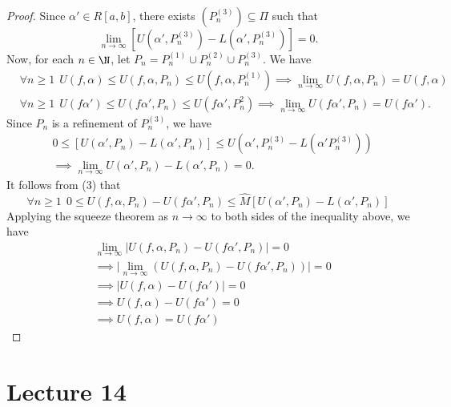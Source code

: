 \begin{proof}
Since \( \alpha' \in R[a,b] \), there exists \( ({P}_{n}^{(3)}) \subseteq \Pi  \) such that 
\[  \lim_{ n \to \infty } [U(\alpha', {P}_{n}^{(3)}) - L(\alpha', {P}_{n}^{(3)})]  = 0.   \]
Now, for each \( n \in \N \), let \( {P}_{n} = {P}_{n}^{(1)} \cup {P}_{n}^{(2)} \cup {P}_{n}^{(3)} \). We have
\begin{align*}
    &\forall n \geq 1 \ \  U(f,\alpha) \leq U(f,\alpha,{P}_{n}) \leq U(f,\alpha, {P}_{n}^{(1)}) \implies \lim_{ n \to \infty  } U(f,\alpha, {P}_{n})  = U(f,\alpha) \tag{4} \\
    &\forall n \geq 1 \ \ U(f \alpha') \leq U(f \alpha' , {P}_{n}) \leq U(f \alpha' , {P}_{n}^{2}) \implies \lim_{ n \to \infty  }  U(f \alpha', {P}_{n}) = U(f \alpha'). \tag{5}
\end{align*}
Since \( {P}_{n} \) is a refinement of \( {P}_{n}^{(3)} \), we have
\begin{align*}
     &0 \leq [U(\alpha', {P}_{n}) - L(\alpha',{P}_{n})] \leq U(\alpha' , {P}_{n}^{(3)} - L(\alpha' {P}_{n}^{(3)})) \\
     &\implies \lim_{ n \to \infty  } U(\alpha', {P}_{n}) - L(\alpha', {P}_{n}) = 0. \tag{6} 
\end{align*}
It follows from (3) that
\[  \forall n \geq 1 \ \ 0 \leq U(f,\alpha, {P}_{n}) - U(f \alpha' , {P}_{n}) \leq \hat{M} [U(\alpha', {P}_{n}) - L(\alpha', {P}_{n})] \]
Applying the squeeze theorem as \( n \to \infty   \) to both sides of the inequality above, we have
\begin{align*}
&\lim_{ n \to \infty   } | U(f,\alpha, {P}_{n}) - U(f \alpha' , {P}_{n}) |  = 0   \\
&\implies \Big| \lim_{ n \to \infty  }  (U(f,\alpha, {P}_{n}) - U(f \alpha', {P}_{n})) \Big| = 0 \\
&\implies | U(f,\alpha) - U(f \alpha') |  = 0 \\
&\implies U(f,\alpha) - U(f \alpha') = 0 \\
&\implies U(f,\alpha) = U(f \alpha')
\end{align*}
\end{proof}


\section{Lecture 14}

